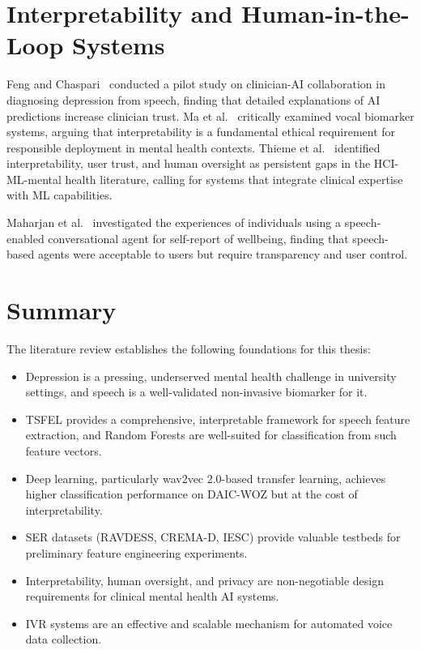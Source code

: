 \section{Interpretability and Human-in-the-Loop Systems}

Feng and Chaspari~\cite{Feng2024} conducted a pilot study on clinician-AI collaboration in diagnosing depression from speech, finding that detailed explanations of AI predictions increase clinician trust. Ma et al.~\cite{Ma2023} critically examined vocal biomarker systems, arguing that interpretability is a fundamental ethical requirement for responsible deployment in mental health contexts. Thieme et al.~\cite{Thieme2020} identified interpretability, user trust, and human oversight as persistent gaps in the HCI-ML-mental health literature, calling for systems that integrate clinical expertise with ML capabilities.

Maharjan et al.~\cite{Maharjan2022} investigated the experiences of individuals using a speech-enabled conversational agent for self-report of wellbeing, finding that speech-based agents were acceptable to users but require transparency and user control.

\section{Summary}

The literature review establishes the following foundations for this thesis:
\begin{itemize}
    \item Depression is a pressing, underserved mental health challenge in university settings, and speech is a well-validated non-invasive biomarker for it.
    \item TSFEL provides a comprehensive, interpretable framework for speech feature extraction, and Random Forests are well-suited for classification from such feature vectors.
    \item Deep learning, particularly wav2vec 2.0-based transfer learning, achieves higher classification performance on DAIC-WOZ but at the cost of interpretability.
    \item SER datasets (RAVDESS, CREMA-D, IESC) provide valuable testbeds for preliminary feature engineering experiments.
    \item Interpretability, human oversight, and privacy are non-negotiable design requirements for clinical mental health AI systems.
    \item IVR systems are an effective and scalable mechanism for automated voice data collection.
\end{itemize}
